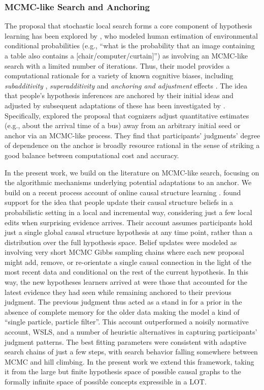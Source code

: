 \documentclass[doc,natbib,floatsintext]{apa7}
\begin{document}
\subsubsection{MCMC-like Search and Anchoring}
The proposal that stochastic local search forms a core component of hypothesis learning has been explored by \cite{dasgupta2017hypotheses}, who modeled human estimation of environmental conditional probabilities (e.g., ``what is the probability that an image containing a table also contains a [chair/computer/curtain]'') as involving an MCMC-like search with a limited number of iterations. Thus, their model provides a computational rationale for a variety of known cognitive biases, including \textit{subadditivity} \citep{fox1998belief}, \textit{superadditivity} \citep{sloman2004typical} and \textit{anchoring and adjustment} effects \citep{hogarth1992order}. The idea that people's hypothesis inferences are anchored by their initial ideas and adjusted by subsequent adaptations of these has been investigated by \citep{lieder2018anchoring}. Specifically, \cite{lieder2018anchoring} explored the proposal that cognizers adjust quantitative estimates (e.g., about the arrival time of a bus) away from an arbitrary initial seed or anchor via an MCMC-like process. They find that participants' judgments' degree of dependence on the anchor is broadly resource rational in the sense of striking a good balance between computational cost and accuracy. 

In the present work, we build on the literature on MCMC-like search, focusing on the algorithmic mechanisms underlying potential adaptations to an anchor. We build on a recent process account of online causal structure learning \citep{bramley2017formalizing}. \cite{bramley2017formalizing} found support for the idea that people update their causal structure beliefs in a probabilistic setting in a local and incremental way, considering just a few local edits when surprising evidence arrives. Their account assumes participants hold just a single global causal structure hypothesis at any time point, rather than a distribution over the full hypothesis space. Belief updates were modeled as involving very short MCMC Gibbs sampling chains where each new proposal might add, remove, or re-orientate a single causal connection in the light of the most recent data and conditional on the rest of the current hypothesis. In this way, the new hypotheses learners arrived at were those that accounted for the latest evidence they had seen while remaining anchored to their previous judgment. The previous judgment thus acted as a stand in for a prior in the absence of complete memory for the older data making the model a kind of ``single particle, particle filter''. This account outperformed a noisily normative account, WSLS, and a number of heuristic alternatives in capturing participants' judgment patterns. The best fitting parameters were consistent with adaptive search chains of just a few steps, with search behavior falling somewhere between MCMC and hill climbing. In the present work we extend this framework, taking it from the large but finite hypothesis space of possible causal graphs to the formally infinite space of possible concepts expressible in a LOT.  
\end{document}
